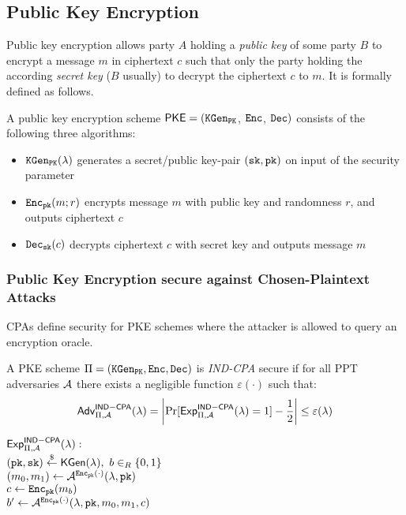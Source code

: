 

\subsection{Public Key Encryption}

Public key encryption allows party $A$ holding a \emph{public key \pk} of some party $B$ to encrypt a message $m$ in ciphertext $c$ such that only the party holding the according \emph{secret key \sk} ($B$ usually) to decrypt the ciphertext $c$ to $m$.
It is formally defined as follows.

\begin{definition}\label{def:pkencryption}
A public key encryption scheme $\mathsf{PKE}=(\mathtt{KGen_{PK}}$, $\mathtt{Enc}$, $\mathtt{Dec})$ consists of the following three algorithms:
\begin{itemize}
  \item $\mathtt{KGen_{PK}}(\lambda)$ generates a secret/public key-pair $(\mathtt{sk},\mathtt{pk})$ on input of the security parameter \secpar
  \item $\mathtt{Enc}_\mathtt{pk}(m; r)$ encrypts message $m$ with public key \pk and randomness $r$, and outputs ciphertext $c$
  \item $\mathtt{Dec}_\mathtt{sk}(c)$ decrypts ciphertext $c$ with secret key \sk and outputs message $m$ \eod
\end{itemize}
\end{definition}


\subsubsection[Chosen-Plaintext Attacks]{Public Key Encryption secure against Chosen-Plaintext Attacks}
\acp{CPA} define security for \ac{PKE} schemes where the attacker is allowed to query an encryption oracle.

\begin{definition}\label{def:indcpa}
A \ac{PKE} scheme $\Pi=(\mathtt{KGen_{PK}},\mathtt{Enc},\mathtt{Dec})$ is \emph{IND-CPA} secure if for all \ac{PPT} adversaries $\mathcal{A}$ there exists a negligible function $\varepsilon(\cdot)$ such that:
\[\mathsf{Adv}_{\Pi,\mathcal{A}}^{\mathsf{IND-CPA}}(\lambda)=\left|\Pr[\mathsf{Exp}^{\mathsf{IND-CPA}}_{\Pi,\mathcal{A}}(\lambda)=1]-\frac12\right|\leq\varepsilon(\lambda)\]

\noindent
$\mathsf{Exp}^{\mathsf{IND-CPA}}_{\Pi,\mathcal{A}}(\lambda):$\\
\hspace*{2em}$(\mathtt{pk},\mathtt{sk})\stackrel{\$}{\gets}\mathsf{KGen}(\lambda),~b\in_R\{0,1\}$\\
\hspace*{2em}$(m_0,m_1)\gets\mathcal{A}^{\mathtt{Enc}_\mathtt{pk}(\cdot)}(\lambda,\mathtt{pk})$\\
\hspace*{2em}$c\gets\mathtt{Enc}_\mathtt{pk}(m_b)$\\
\hspace*{2em}$b'\gets\mathcal{A}^{\mathtt{Enc}_\mathtt{pk}(\cdot)}(\lambda,\mathtt{pk},m_0,m_1,c)$\\
\eod
\end{definition}


